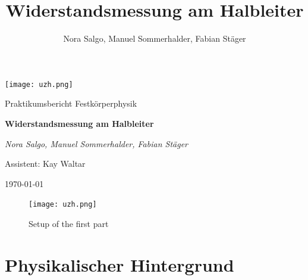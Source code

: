 \documentclass[a4paper]{scrartcl}
\title{Widerstandsmessung am Halbleiter}
\author{Nora Salgo, Manuel Sommerhalder, Fabian Stäger}
\begin{document}
\begin{titlepage}
	\centering
	\texttt{[image: uzh.png]}\par\vspace{1cm}
	\vspace{1cm}
	{\Large Praktikumsbericht Festkörperphysik\par}
	\vspace{1.5cm}
	{\huge\bfseries Widerstandsmessung am Halbleiter\par}
	\vspace{2cm}
	{\Large\itshape Nora Salgo, Manuel Sommerhalder, Fabian Stäger \par\vspace{1cm}
	Assistent: Kay Waltar}
	\vfill
	

	\vfill

	{\large \today\par}
\end{titlepage}


\begin{figure}[htbp]
\centering
\texttt{[image: uzh.png]}
\caption{Setup of the first part}
\label{setup1}
\end{figure}
%

\section{Physikalischer Hintergrund}
\label{ch:Physik}
\end{document}
